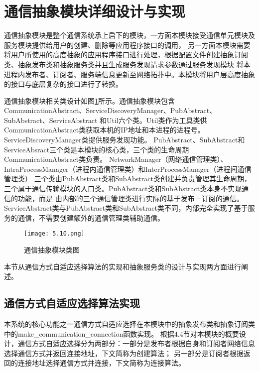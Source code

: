 \section{通信抽象模块详细设计与实现}
通信抽象模块是整个通信系统承上启下的模块，一方面本模块接受通信单元模块及服务模块提供给用户的创建、删除等应用程序接口的调用，
另一方面本模块需要将用户所使用的高度抽象的应用程序接口进行处理，根据配置文件创建抽象订阅类、抽象发布类和抽象服务类并且生成服务发现请求参数通过服务发现模块
将本进程内发布者、订阅者、服务端信息更新至网络拓扑中。本模块将用户层高度抽象的接口与底层复杂的接口进行了转换。

通信抽象模块相关类设计如图\ref{communication_abstract_class}所示。通信抽象模块包含CommunicationAbstract、ServiceDiscoveryManager、PubAbstract、SubAbstract、ServiceAbstract
和Util六个类。Util类作为工具类供CommunicationAbstract类获取本机的IP地址和本进程的进程号。ServiceDiscoveryManager类提供服务发现功能。
PubAbstract、SubAbstract和ServiceAbsract三个类是本模块的核心类，三个类的生命周期CommunicationAbstract类负责。
NetworkManager（网络通信管理类）、IntraProcessManager（进程内通信管理类）和InterProcessManager（进程间通信管理类）
三个类由PubAbstract类和SubAbstract类创建并负责管理其生命周期，三个属于通信传输模块的入口类。PubAbstract类和SubAbstract类本身不实现通信的功能，而是
由内部的三个通信管理类进行实际的基于发布－订阅的通信。
ServiceAbstract类与PubAbstract类和SubAbstract类不同，内部完全实现了基于服务的通信，不需要创建额外的通信管理类辅助通信。
\begin{figure}[H]
  \centering
  \texttt{[image: 5.10.png]}
  \caption{通信抽象模块类图}
  \label{communication_abstract_class}
\end{figure}

本节从通信方式自适应选择算法的实现和抽象服务类的设计与实现两方面进行阐述。

\subsection{通信方式自适应选择算法实现}
本系统的核心功能之一通信方式自适应选择在本模块中的抽象发布类和抽象订阅类中的make\_communication\_connection函数实现。
根据4.4节对本模块的概要设计，通信方式自适应选择分为两部分：一部分是发布者根据自身和订阅者网络信息选择通信方式并返回连接地址，下文简称为创建算法；
另一部分是订阅者根据返回的连接地址选择通信方式并连接，下文简称为连接算法。

